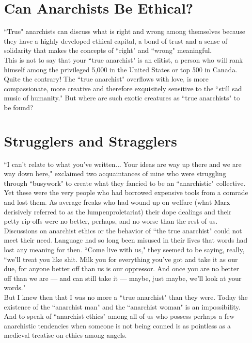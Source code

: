 \section*{Can Anarchists Be Ethical?}
``True" anarchists can discuss what is right and wrong among themselves because they have a highly developed ethical capital, a bond of trust and a sense of solidarity that makes the concepts of ``right" and ``wrong" meaningful.\\
This is not to say that your ``true anarchist" is an elitist, a person who will rank himself among the privileged 5,000 in the United States or top 500 in Canada. Quite the contrary! The ``true anarchist" overflows with love, is more compassionate, more creative and therefore exquisitely sensitive to the ``still sad music of humanity." But where are such exotic creatures as ``true anarchists" to be found?

\section*{Strugglers and Stragglers}
``I can't relate to what you've written... Your ideas are way up there and we are way down here," exclaimed two acquaintances of mine who were struggling through ``busywork" to create what they fancied to be an ``anarchistic" collective. Yet these were the very people who had borrowed expensive tools from a comrade and lost them. As average freaks who had wound up on welfare (what Marx derisively referred to as the lumpenproletariat) their dope dealings and their petty rip-offs were no better, perhaps, and no worse than the rest of us.\\
Discussions on anarchist ethics or the behavior of ``the true anarchist" could not meet their need. Language had so long been misused in their lives that words had lost any meaning for then. ``Come live with us," they seemed to be saying, really, ``we'll treat you like shit. Milk you for everything you've got and take it as our due, for anyone better off than us is our oppressor. And once you are no better off than we are --- and can still take it --- maybe, just maybe, we'll look at your words."\\
But I knew then that I was no more a ``true anarchist" than they were. Today the existence of the ``anarchist man" and the ``anarchist woman" is an impossibility. And to speak of ``anarchist ethics" among all of us who possess perhaps a few anarchistic tendencies when someone is not being conned is as pointless as a medieval treatise on ethics among angels.

